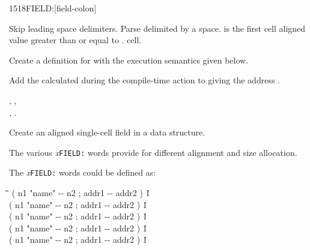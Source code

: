 \vspace*{-2ex}
\begin{worddef}{1518}{FIELD:}[field-colon]%
\item {}

	Skip leading space delimiters. Parse  delimited by
	a space.  is the first cell aligned value greater
	than or equal to .   cell.

	Create a definition for  with the execution semantics
	given below.

\execute[name]

	Add the  calculated during the compile-time action
	to  giving the address .

\see {},
	, \\
	,
	.

	\begin{rationale}
		Create an aligned single-cell field in a data structure.

		The various \emph{x}\texttt{FIELD:} words provide for different
		alignment and size allocation.

		The \emph{x}\texttt{FIELD:} words could be defined as:

		\begin{tabbing}
			\tab \= \tab[6] \= \tab[22] \= \tab[5] \= \tab[5.2] \= \kill
			\> \word{:}    \>( n1 "name" -{}- n2 ; addr1 -{}- addr2 )\>    \' 1    \>  \word{;} \\
			\> \word{:}   \>( n1 "name" -{}- n2 ; addr1 -{}- addr2 )\>                  \' 1    \>  \word{;} \\
			\> \word{:}   \>( n1 "name" -{}- n2 ; addr1 -{}- addr2 )\>   \' 1   \>  \word{;} \\
			\> \word{:}  \>( n1 "name" -{}- n2 ; addr1 -{}- addr2 )\>  \' 1  \>  \word{;} \\
			\> \word{:}  \>( n1 "name" -{}- n2 ; addr1 -{}- addr2 )\>  \' 1  \>  \word{;}
		\end{tabbing}
	\end{rationale}
\end{worddef}

